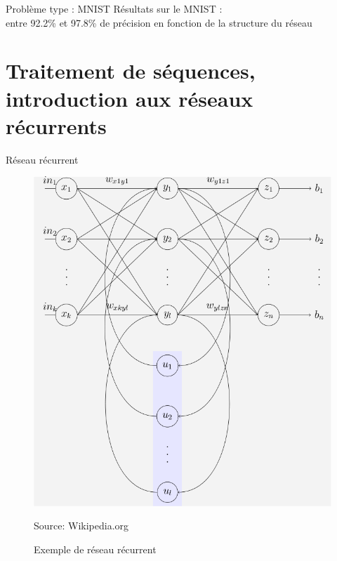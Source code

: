 \documentclass{beamer}
\begin{document}
\begin{frame}{Problème type : MNIST}
Résultats sur le MNIST : \\
\vspace{20px}
entre 92.2\% et 97.8\% de précision en fonction de la structure du réseau
\end{frame}

\section{Traitement de séquences, introduction aux réseaux récurrents}

\begin{frame}{Réseau récurrent}
  \begin{figure}
  \begin{center}
  \includegraphics[scale=0.25]{images/reseau_recurrent.png}
  \caption{Exemple de réseau récurrent}
  {\tiny Source: Wikipedia.org}
  \end{center}
  \end{figure}
\end{frame}
\end{document}
